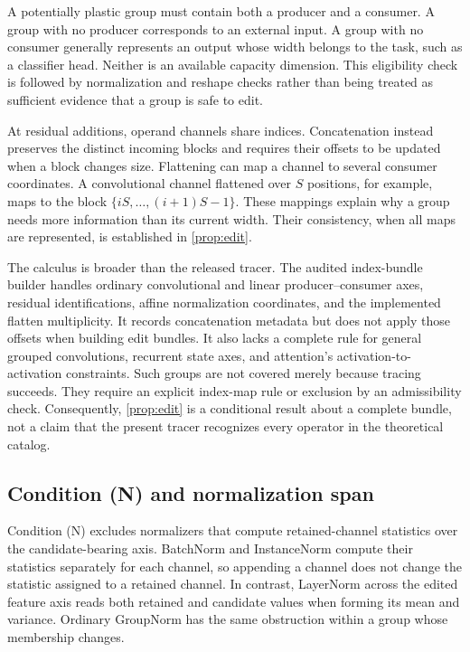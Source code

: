 \documentclass[10pt]{article}
\theoremstyle{paper}
\begin{document}
A potentially plastic group must contain both a producer and a consumer. A group with no producer corresponds to an external input. A group with no consumer generally represents an output whose width belongs to the task, such as a classifier head. Neither is an available capacity dimension. This eligibility check is followed by normalization and reshape checks rather than being treated as sufficient evidence that a group is safe to edit.

At residual additions, operand channels share indices. Concatenation instead preserves the distinct incoming blocks and requires their offsets to be updated when a block changes size. Flattening can map a channel to several consumer coordinates. A convolutional channel flattened over $S$ positions, for example, maps to the block $\{iS,\ldots,(i+1)S-1\}$. These mappings explain why a group needs more information than its current width. Their consistency, when all maps are represented, is established in \cref{prop:edit}.

The calculus is broader than the released tracer. The audited index-bundle builder handles ordinary convolutional and linear producer--consumer axes, residual identifications, affine normalization coordinates, and the implemented flatten multiplicity. It records concatenation metadata but does not apply those offsets when building edit bundles. It also lacks a complete rule for general grouped convolutions, recurrent state axes, and attention's activation-to-activation constraints. Such groups are not covered merely because tracing succeeds. They require an explicit index-map rule or exclusion by an admissibility check. Consequently, \cref{prop:edit} is a conditional result about a complete bundle, not a claim that the present tracer recognizes every operator in the theoretical catalog.

\subsection{Condition (N) and normalization span}
\label{app:normalization}
Condition (N) excludes normalizers that compute retained-channel statistics over the candidate-bearing axis. BatchNorm and InstanceNorm \citep{ioffe2015batch,ulyanov2016instance} compute their statistics separately for each channel, so appending a channel does not change the statistic assigned to a retained channel. In contrast, LayerNorm \citep{ba2016layer} across the edited feature axis reads both retained and candidate values when forming its mean and variance. Ordinary GroupNorm \citep{wu2018group} has the same obstruction within a group whose membership changes.
\end{document}
